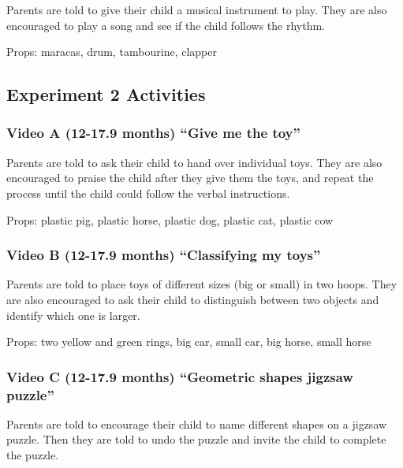 \documentclass[man,floatsintext]{apa6}
\begin{document}
\begin{appendix}
Parents are told to give their child a musical instrument to play. They
are also encouraged to play a song and see if the child follows the
rhythm.

Props: maracas, drum, tambourine, clapper

\hypertarget{experiment-2-activities}{%
\subsection{Experiment 2 Activities}\label{experiment-2-activities}}

\hypertarget{video-a-12-17.9-months-give-me-the-toy}{%
\subsubsection{Video A (12-17.9 months) ``Give me the
toy''}\label{video-a-12-17.9-months-give-me-the-toy}}

Parents are told to ask their child to hand over individual toys. They
are also encouraged to praise the child after they give them the toys,
and repeat the process until the child could follow the verbal
instructions.

Props: plastic pig, plastic horse, plastic dog, plastic cat, plastic cow

\hypertarget{video-b-12-17.9-months-classifying-my-toys}{%
\subsubsection{Video B (12-17.9 months) ``Classifying my
toys''}\label{video-b-12-17.9-months-classifying-my-toys}}

Parents are told to place toys of different sizes (big or small) in two
hoops. They are also encouraged to ask their child to distinguish
between two objects and identify which one is larger.

Props: two yellow and green rings, big car, small car, big horse, small
horse

\hypertarget{video-c-12-17.9-months-geometric-shapes-jigzsaw-puzzle}{%
\subsubsection{Video C (12-17.9 months) ``Geometric shapes jigzsaw
puzzle''}\label{video-c-12-17.9-months-geometric-shapes-jigzsaw-puzzle}}

Parents are told to encourage their child to name different shapes on a
jigzsaw puzzle. Then they are told to undo the puzzle and invite the
child to complete the puzzle.


\end{appendix}
\end{document}
